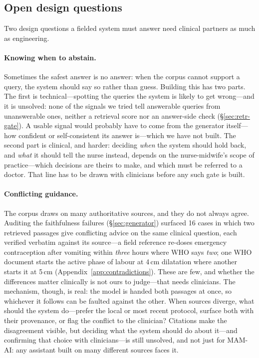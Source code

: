 \subsection{Open design questions}

Two design questions a fielded system must answer need clinical partners as much
as engineering.

\paragraph{Knowing when to abstain.} Sometimes the safest answer is no answer:
when the corpus cannot support a query, the system should say so rather than
guess. Building this has two parts. The first is technical---spotting the queries
the system is likely to get wrong---and it is unsolved: none of the signals we
tried tell answerable queries from unanswerable ones, neither a retrieval score
nor an answer-side check (\S\ref{sec:retr-gate}). A usable signal would probably
have to come from the generator itself---how confident or self-consistent its
answer is---which we have not built. The second part is clinical, and harder:
deciding \emph{when} the system should hold back, and \emph{what} it should tell
the nurse instead, depends on the nurse-midwife's scope of practice---which
decisions are theirs to make, and which must be referred to a doctor. That line
has to be drawn with clinicians before any such gate is built.

\paragraph{Conflicting guidance.} The corpus draws on many authoritative
sources, and they do not always agree. Auditing the faithfulness failures
(\S\ref{sec:generator}) surfaced 16 cases in which two retrieved passages give
conflicting advice on the same clinical question, each verified verbatim against
its source---a field reference re-doses emergency contraception after vomiting
within \emph{three} hours where WHO says \emph{two}; one WHO document starts the
active phase of labour at 4\,cm dilatation where another starts it at 5\,cm
(Appendix~\ref{app:contradictions}). These are few, and whether the differences
matter clinically is not ours to judge---that needs clinicians. The mechanism,
though, is real: the model is handed both passages at once, so whichever it
follows can be faulted against the other. When sources diverge,
what should the system do---prefer the local or most recent protocol, surface
both with their provenance, or flag the conflict to the clinician? Citations make
the disagreement visible, but deciding what the system should do about it---and
confirming that choice with clinicians---is still unsolved, and not just for
MAM-AI: any assistant built on many different sources faces it.

